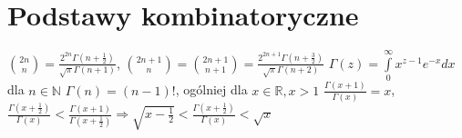 \documentclass{pracamgr}
\begin{document}
  \section{Podstawy kombinatoryczne}
   ${2n \choose n}=\frac{2^{2n}\Gamma(n+\frac{1}{2})}{\sqrt{\pi}\Gamma(n+1)}$,\quad\quad
   ${2n+1 \choose n}={2n+1 \choose n+1}=\frac{2^{2n+1}\Gamma(n+\frac{3}{2})}{\sqrt{\pi}\Gamma(n+2)}$\newline
   $\Gamma(z)=\int\limits_{0}^{\infty}x^{z-1}e^{-x}dx$\quad
   dla $n\in\mathbb{N}$ $\Gamma(n)=(n-1)!$,\newline
   ogólniej dla $x\in\mathbb{R},x>1$ $\frac{\Gamma(x+1)}{\Gamma(x)}=x$,\quad\quad
   $\frac{\Gamma(x+\frac{1}{2})}{\Gamma(x)}<\frac{\Gamma(x+1)}{\Gamma(x+\frac{1}{2})}\Rightarrow
   \sqrt{x-\frac{1}{2}}<\frac{\Gamma(x+\frac{1}{2})}{\Gamma(x)}<\sqrt{x}$\newline
\end{document}
